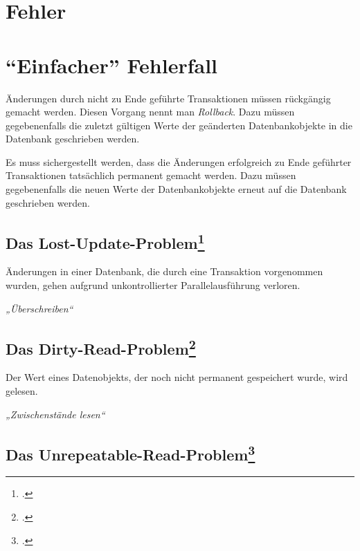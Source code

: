 \documentclass{lehramt-informatik}
\begin{document}
%

\section{Fehler}

\section{“Einfacher” Fehlerfall}

Änderungen durch nicht zu Ende geführte Transaktionen müssen rückgängig
gemacht werden. Diesen Vorgang nennt man \emph{Rollback}. Dazu müssen
gegebenenfalls die zuletzt gültigen Werte der geänderten
Datenbankobjekte in die Datenbank geschrieben werden.

Es muss sichergestellt werden, dass die Änderungen erfolgreich zu Ende
geführter Transaktionen tatsächlich permanent gemacht werden. Dazu
müssen gegebenenfalls die neuen Werte der Datenbankobjekte erneut auf
die Datenbank geschrieben werden.

%

\subsection{Das Lost-Update-Problem\footcite{wiki:verlorenes-update}}

Änderungen in einer Datenbank, die durch eine Transaktion vorgenommen
wurden, gehen aufgrund unkontrollierter Parallelausführung verloren.

\emph{„Überschreiben“}

%

\subsection{Das Dirty-Read-Problem\footcite{wiki:schreib-lese-konflikt}}

Der Wert eines Datenobjekts, der noch nicht permanent gespeichert wurde,
wird gelesen.

\emph{„Zwischenstände lesen“}

%

\subsection{Das Unrepeatable-Read-Problem\footcite{wiki:nichtwiederholbares-lesen}}
\end{document}
